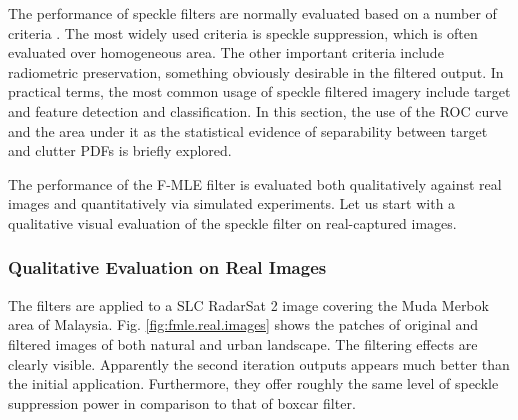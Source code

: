 
The performance of speckle filters are normally evaluated based on a number of criteria \citep{Nyoungui_2002_IntlJRemoteSense}.
The most widely used criteria is speckle suppression, 
  which is often evaluated over homogeneous area.
The other important criteria include radiometric preservation, something obviously desirable in the filtered output.
In practical terms, the most common usage of speckle filtered imagery include target and feature detection and classification.
In this section, the use of the ROC curve and the area under it as the statistical evidence of separability between target and clutter PDFs is briefly explored.

The performance of the F-MLE filter is evaluated both qualitatively against real
images and quantitatively via simulated experiments. 
Let us start with a qualitative visual evaluation of the speckle filter on real-captured images.

\subsubsection{Qualitative Evaluation on Real Images}

The filters are applied to a SLC RadarSat 2 image covering the Muda Merbok area of Malaysia.
Fig. \ref{fig:fmle.real.images} shows the patches of original and filtered images of both natural and urban landscape.
The filtering effects are clearly visible.
Apparently the second iteration outputs appears much better than the initial application.
Furthermore, they offer roughly the same level of speckle suppression power in comparison to that of boxcar filter.

\afterpage{\clearpage}

